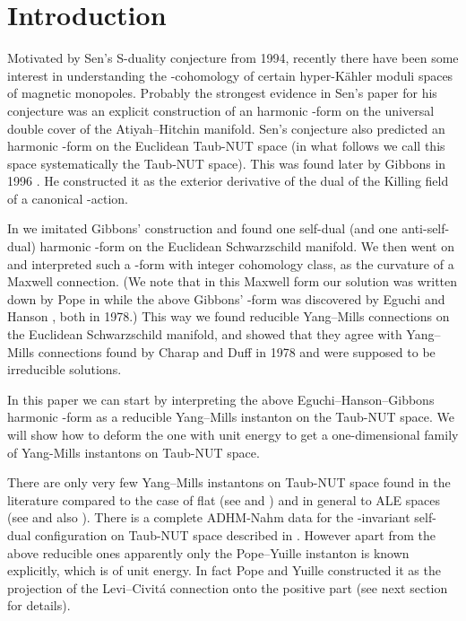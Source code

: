 \documentclass[a4paper,12pt,draft]{article}
\begin{document}
\newpage

\section{Introduction}
Motivated by Sen's S-duality conjecture \cite{sen} from 1994,  
recently there have been some interest in understanding the \coordHE{}-cohomology of
certain hyper-K\"ahler moduli spaces of magnetic monopoles. Probably the 
strongest evidence in Sen's paper for his conjecture was
an explicit construction of an \coordHE{} harmonic \coordHE{}-form on the universal 
double cover of the Atiyah--Hitchin manifold. Sen's conjecture also
predicted an \coordHE{} harmonic \coordHE{}-form on the Euclidean Taub-NUT space (in
what follows we call this space systematically the Taub-NUT
space). This was found later by Gibbons in 1996 \cite{gib}. He constructed
it as the exterior derivative of the dual of the Killing field of a
canonical \coordHE{}-action. 

In \cite{ete-hau} we imitated Gibbons' construction and found one self-dual
(and one anti-self-dual) \coordHE{} harmonic \coordHE{}-form on the Euclidean 
Schwarzschild manifold. We then went on and interpreted such a \coordHE{}-form
with integer cohomology class, as the curvature of a \coordHE{} Maxwell
connection. (We note that in this Maxwell form our solution was written 
down by Pope in \cite{pop} while the above Gibbons' \coordHE{}-form
was discovered by Eguchi and Hanson \cite{egu-han}, both in
1978.) This way we found reducible \coordHE{} Yang--Mills connections on the
Euclidean Schwarzschild manifold, and showed that they agree with \coordHE{}
Yang--Mills connections found by Charap and Duff in 1978 \cite{cha-duf}
and were supposed to be irreducible solutions. 

In this paper we can start by interpreting the above
Eguchi--Hanson--Gibbons \coordHE{} harmonic \coordHE{}-form as a reducible \coordHE{}
Yang--Mills instanton on the Taub-NUT space. 
We will show how to deform the one with unit energy to get a
one-dimensional family of \coordHE{} Yang-Mills instantons on Taub-NUT space. 

There are only very few \coordHE{} Yang--Mills instantons on Taub-NUT space
found in the literature compared to the case of flat \coordHE{} (see
\cite{jac-noh-reb} and \cite{ati-dri-hit-man}) and
in general to ALE spaces (see \cite{kro-nak} and also \cite{bia-fuc-ros-mar}).
There is a complete ADHM-Nahm data for the
\coordHE{}-invariant self-dual configuration on Taub-NUT space described in
\cite{che-kap}.  
However apart from the above reducible ones apparently only the Pope--Yuille
instanton \cite{pop-yui} is known explicitly, which is of unit energy. 
In fact Pope and Yuille constructed it as the projection of the
Levi--Civit\'a connection onto the positive \myHighlight{$\su^+\subset\so$}\coordHE{} part (see
next section for details). 
\end{document}
